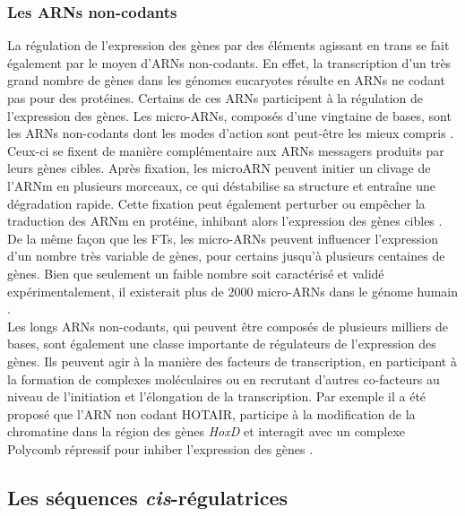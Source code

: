 \subsubsection{Les ARNs non-codants}
\label{subsubsec:ARN-noncodant}

La régulation de l’expression des gènes par des éléments agissant en \gls{trans} se fait également par le moyen d’\acrshort{ARN}s non-codants. En effet, la transcription d’un très grand nombre de gènes dans les génomes eucaryotes résulte en \acrshort{ARN}s ne codant pas pour des protéines. Certains de ces \acrshort{ARN}s participent à la régulation de l’expression des gènes. Les micro-\acrshort{ARN}s, composés d’une vingtaine de bases, sont les \acrshort{ARN}s non-codants dont les modes d’action sont peut-être les mieux compris \citep{bartel_micrornas_2004}. Ceux-ci se fixent de manière complémentaire aux \acrshort{ARN}s messagers produits par leurs gènes cibles. Après fixation, les microARN peuvent initier un clivage de l’\acrshort{ARNm} en plusieurs morceaux, ce qui déstabilise sa structure et entraîne une dégradation rapide. Cette fixation peut également perturber ou empêcher la traduction des \acrshort{ARNm} en protéine, inhibant alors l’expression des gènes cibles \citep{bartel_micrornas_2004}. De la même façon que les \acrshort{FT}s, les micro-\acrshort{ARN}s peuvent influencer l’expression d’un nombre très variable de gènes, pour certains jusqu’à plusieurs centaines de gènes. Bien que seulement un faible nombre soit caractérisé et validé expérimentalement, il existerait plus de 2000 micro-\acrshort{ARN}s dans le génome humain \citep{alles_estimate_2019}.\\

Les longs \acrshort{ARN}s non-codants, qui peuvent être composés de plusieurs milliers de bases, sont également une classe importante de régulateurs de l’expression des gènes. Ils peuvent agir à la manière des facteurs de transcription, en participant à la formation de complexes moléculaires ou en recrutant d’autres co-facteurs au niveau de l'initiation et l’élongation de la transcription. Par exemple il a été proposé que l’ARN non codant HOTAIR, participe à la modification de la chromatine dans la région des gènes \textit{HoxD} et interagit avec un complexe Polycomb répressif pour inhiber l’expression des gènes \citep{rinn_functional_2007}.

\subsection{Les séquences \textit{cis}-régulatrices}
\label{subsec:elem-cis}

